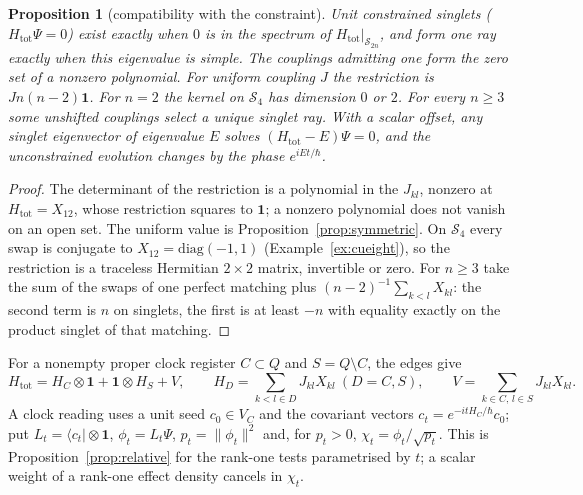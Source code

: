 \documentclass[aps,pra,onecolumn,superscriptaddress,nofootinbib,10pt]{revtex4-2}
\newtheorem{proposition}[theorem]{Proposition}
\theoremstyle{definition}
\theoremstyle{remark}
\begin{document}
\begin{proposition}[compatibility with the constraint]\label{prop:cukernel}
Unit constrained singlets ($H_{\mathrm{tot}}\Psi=0$) exist exactly when $0$ is in the spectrum of $H_{\mathrm{tot}}|_{\mathcal S_{2n}}$, and form one
ray exactly when this eigenvalue is simple.  The couplings admitting one form the zero set of a nonzero
polynomial.  For uniform coupling $J$ the restriction is $Jn(n-2)\mathbf1$.  For $n=2$ the kernel on $\mathcal S_4$ has dimension
$0$ or $2$.  For every $n\ge3$ some unshifted couplings select a unique singlet ray.  With a scalar offset, any
singlet eigenvector of eigenvalue $E$ solves $(H_{\mathrm{tot}}-E)\Psi=0$, and the unconstrained evolution changes by the phase
$e^{iEt/\hbar}$.
\end{proposition}
\begin{proof}
The determinant of the restriction is a polynomial in the $J_{kl}$, nonzero at $H_{\mathrm{tot}}=X_{12}$, whose restriction
squares to $\mathbf1$; a nonzero polynomial does not vanish on an open set.  The uniform value is Proposition~\ref{prop:symmetric}.
On $\mathcal S_4$ every swap is conjugate to $X_{12}=\mathrm{diag}(-1,1)$ (Example~\ref{ex:cueight}), so the restriction is a traceless
Hermitian $2\times2$ matrix, invertible or zero.  For $n\ge3$ take the sum of the swaps of one perfect matching
plus $(n-2)^{-1}\sum_{k<l}X_{kl}$: the second term is $n$ on singlets, the first is at least $-n$ with equality exactly
on the product singlet of that matching.
\end{proof}

For a nonempty proper clock register $C\subset Q$ and $S=Q\setminus C$, the edges give
\begin{equation}\label{eq:cusplit}
H_{\mathrm{tot}}=H_C\otimes\mathbf1+\mathbf1\otimes H_S+V,\qquad H_D=\sum_{k<l\in D}J_{kl}X_{kl}\ (D=C,S),\qquad V=\sum_{k\in C,\,l\in S}J_{kl}X_{kl}.
\end{equation}
A clock reading uses a unit seed $c_0\in V_C$ and the covariant vectors $c_t=e^{-itH_C/\hbar}c_0$; put $L_t=\langle c_t\rvert\otimes\mathbf1$,
$\phi_t=L_t\Psi$, $p_t=\lVert\phi_t\rVert^2$ and, for $p_t>0$, $\chi_t=\phi_t/\sqrt{p_t}$.  This is Proposition~\ref{prop:relative} for the rank-one tests
parametrised by $t$; a scalar weight of a rank-one effect density cancels in $\chi_t$.
\end{document}
